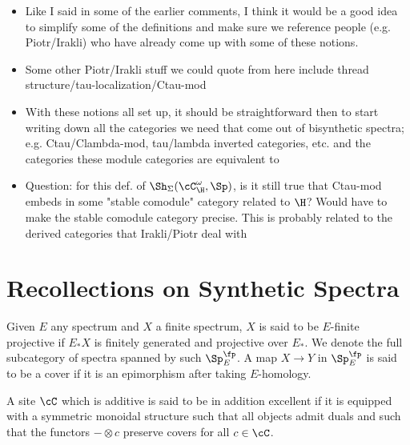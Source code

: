 

\begin{itemize}
  \item Like I said in some of the earlier comments, I think it would be a good idea to simplify some of the definitions and make sure we reference people (e.g. Piotr/Irakli) who have already come up with some of these notions.
  \item Some other Piotr/Irakli stuff we could quote from here include thread structure/tau-localization/Ctau-mod
  \item With these notions all set up, it should be straightforward then to start writing down all the categories we need that come out of bisynthetic spectra; e.g. Ctau/Clambda-mod, tau/lambda inverted categories, etc. and the categories these module categories are equivalent to
  \item Question: for this def. of $\Sh_\Sigma(\cC^\omega_\H, \Sp)$, is it still true that Ctau-mod embeds in some "stable comodule" category related to $\H$? Would have to make the stable comodule category precise. This is probably related to the derived categories that Irakli/Piotr deal with
\end{itemize}















\section{Recollections on Synthetic Spectra}

\begin{definition}
  Given $E$ any spectrum and $X$ a finite spectrum, $X$ is said to be $E$-finite projective if $E_*X$ is finitely generated and projective over $E_*$. We denote the full subcategory of spectra spanned by such $\Sp^\fp_E$. A map $X\to Y$ in $\Sp^\fp_E$ is said to be a cover if it is an epimorphism after taking $E$-homology.
\end{definition}

\begin{definition}
  A site $\cC$ which is additive is said to be in addition excellent if it is equipped with a symmetric monoidal structure such that all objects admit duals and such that the functors $-\otimes c$ preserve covers for all $c\in \cC$.
\end{definition}

